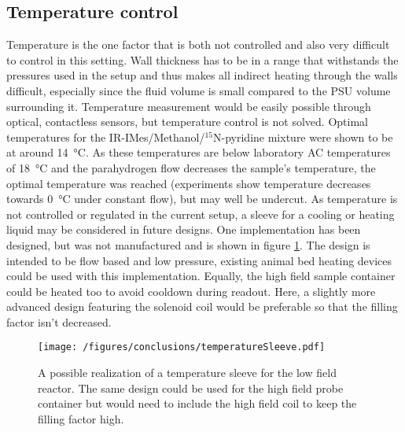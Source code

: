         \subsection{Temperature control}
            \label{cd:sabreShuttling:tempControl}
            Temperature is the one factor that is both not controlled and also very difficult to control in this setting. Wall thickness has to be in a range that withstands the pressures used in the setup and thus makes all indirect heating through the walls difficult, especially since the fluid volume is small compared to the PSU volume surrounding it. Temperature measurement would be easily possible through optical, contactless sensors, but temperature control is not solved. Optimal temperatures for the IR-IMes/Methanol/$^{15}$N-pyridine mixture were shown to be at around \SI{14}{\celsius}. As these temperatures are below laboratory AC temperatures of \SI{18}{\celsius} and the parahydrogen flow decreases the sample's temperature, the optimal temperature was reached (experiments show temperature decreases towards \SI{0}{\celsius} under constant flow), but may well be undercut. As temperature is not controlled or regulated in the current setup, a sleeve for a cooling or heating liquid may be considered in future designs. One implementation has been designed, but was not manufactured and is shown in figure \ref{fig:conclusions:tempSleeve}. The design is intended to be flow based and low pressure, existing animal bed heating devices could be used with this implementation. Equally, the high field sample container could be heated too to avoid cooldown during readout. Here, a slightly more advanced design featuring the solenoid coil would be preferable so that the filling factor isn't decreased.
            \begin{figure}
                \texttt{[image: /figures/conclusions/temperatureSleeve.pdf]}
                \caption[Temperature sleeve]{A possible realization of a temperature sleeve for the low field reactor. The same design could be used for the high field probe container but would need to include the high field coil to keep the filling factor high.}
                \label{fig:conclusions:tempSleeve}
            \end{figure}
